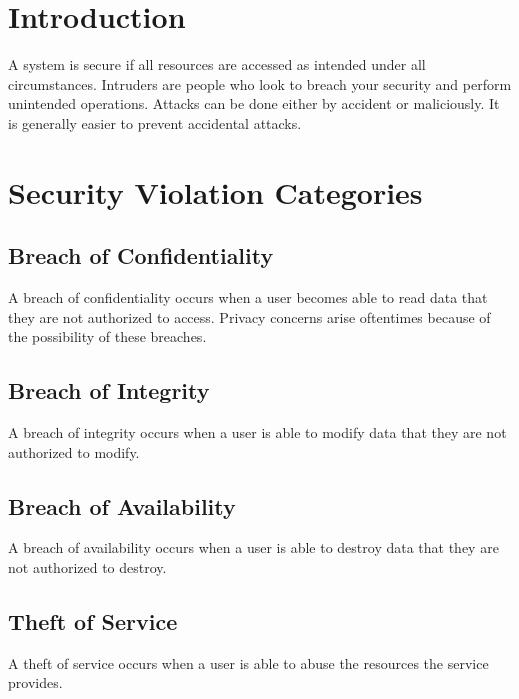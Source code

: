 \documentclass{article}
\begin{document}
\maketitle
\tableofcontents

\section{Introduction}

A system is secure if all resources are accessed as intended under all
circumstances. Intruders are people who look to breach your security and
perform unintended operations. Attacks can be done either by accident or
maliciously. It is generally easier to prevent accidental attacks.

\section{Security Violation Categories}

\subsection{Breach of Confidentiality}

A breach of confidentiality occurs when a user becomes able to read data that
they are not authorized to access. Privacy concerns arise oftentimes because
of the possibility of these breaches.

\subsection{Breach of Integrity}

A breach of integrity occurs when a user is able to modify data that they are
not authorized to modify.

\subsection{Breach of Availability}

A breach of availability occurs when a user is able to destroy data that they
are not authorized to destroy.

\subsection{Theft of Service}

A theft of service occurs when a user is able to abuse the resources the
service provides.
\end{document}
